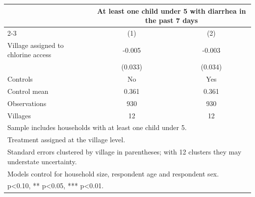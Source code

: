 {
\def\sym#1{\ifmmode^{#1}\else\(^{#1}\)\fi}
\begin{tabular}{l*{2}{c}}
\toprule
                    &\multicolumn{2}{c}{At least one child under 5 with diarrhea in the past 7 days}\\\cmidrule(lr){2-3}
                    &\multicolumn{1}{c}{(1)}         &\multicolumn{1}{c}{(2)}         \\
\midrule
Village assigned to chlorine access&      -0.005         &      -0.003         \\
                    &     (0.033)         &     (0.034)         \\
\midrule
Controls            &          No         &         Yes         \\
Control mean        &       0.361         &       0.361         \\
Observations        &         930         &         930         \\
Villages            &          12         &          12         \\
\bottomrule
\multicolumn{3}{l}{\footnotesize Sample includes households with at least one child under 5.}\\
\multicolumn{3}{l}{\footnotesize Treatment assigned at the village level.}\\
\multicolumn{3}{l}{\footnotesize Standard errors clustered by village in parentheses; with 12 clusters they may understate uncertainty.}\\
\multicolumn{3}{l}{\footnotesize Models control for household size, respondent age and respondent sex.}\\
\multicolumn{3}{l}{\footnotesize * p<0.10, ** p<0.05, *** p<0.01.}\\
\end{tabular}
}
